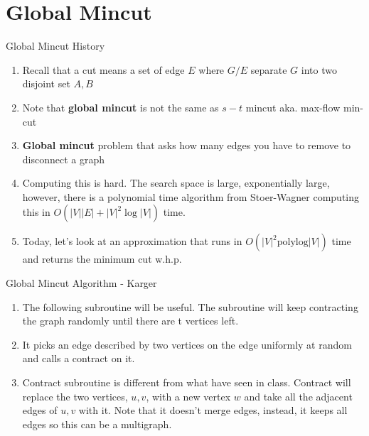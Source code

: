 \section{Global Mincut}

\begin{frame}{Global Mincut History}
    \begin{enumerate}\addtolength{\itemsep}{1em} %
        \item Recall that a cut means a set of edge $E$ where $G / E$ separate $G$ into two disjoint set $A, B$
        \item Note that \textbf{global mincut} is not the same as $s-t$ mincut aka. max-flow min-cut
        \item \textbf{Global mincut} problem that asks how many edges you have to remove to disconnect a graph
        \item Computing this is hard. The search space is large, exponentially large, however, there is a polynomial time algorithm from Stoer-Wagner computing this in $O(|V||E| + |V|^2\log{|V|})$ time.
        \item Today, let's look at an approximation that runs in $O(|V|^2\text{polylog}{|V|})$ time and returns the minimum cut w.h.p.
    \end{enumerate}
\end{frame}

\begin{frame}[fragile]{Global Mincut Algorithm - Karger}
    \begin{enumerate}
        \item The following subroutine will be useful. The subroutine will keep contracting the graph randomly until there are t vertices left.
        \item It picks an edge described by two vertices on the edge uniformly at random and calls a contract on it.
        \item Contract subroutine is different from what have seen in class. Contract will replace the two vertices, $u, v$, with a new vertex $w$ and take all the adjacent edges of $u, v$ with it. Note that it doesn't merge edges, instead, it keeps all edges so this can be a multigraph.
    \end{enumerate}
    \begin{algorithm}[H]
      \caption{\textsc{Contraction}(Graph G, Integer t) Karger's}
      \begin{algorithmic}
        \EndWhile
      \end{algorithmic}
      \end{algorithm}
\end{frame}

